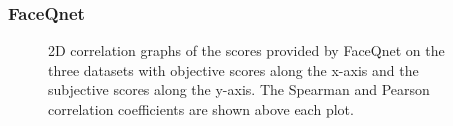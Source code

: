 \subsubsection{FaceQnet}
\begin{figure}[h]
\centering
    \caption{2D correlation graphs of the scores provided by FaceQnet on the three datasets with objective scores along the x-axis and the subjective scores along the y-axis. The Spearman and Pearson correlation coefficients are shown above each plot.}
    \label{fig:corrFACEQNETsvsSub}
\end{figure}
